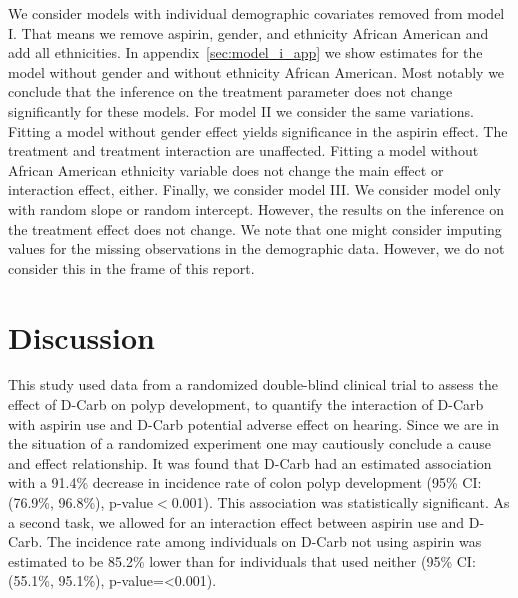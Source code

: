 \documentclass[paper=a4, fontsize=11pt]{scrartcl} %
\numberwithin{equation}{section} %
\numberwithin{figure}{section} %
\numberwithin{table}{section} %
\begin{document}
We consider models with individual demographic covariates removed from model I. That means we remove aspirin, gender, and ethnicity African American and add all ethnicities. In appendix~\ref{sec:model_i_app} we show estimates for the model without gender and without ethnicity African American. Most notably we conclude that the inference on the treatment parameter does not change significantly for these models. For model II we consider the same variations. Fitting a model without gender effect yields significance in the aspirin effect. The treatment and treatment interaction are unaffected. Fitting a model without African American ethnicity variable does not change the main effect or interaction effect, either. Finally, we consider model III. We consider model only with random slope or random intercept. However, the results on the inference on the treatment effect does not change. We note that one might consider imputing values for the missing observations in the demographic data. However, we do not consider this in the frame of this report.






\section{Discussion}
This study used data from a randomized double-blind clinical trial to assess the effect of D-Carb on polyp development, to quantify the interaction of D-Carb with aspirin use and D-Carb potential adverse effect on hearing. Since we are in the situation of a randomized experiment one may cautiously conclude a cause and effect relationship. It was found that D-Carb had an estimated association with a 91.4\% decrease in incidence rate of colon polyp development (95\% CI: (76.9\%, 96.8\%), p-value$<$0.001). This association was statistically significant. As a second task, we allowed for an interaction effect between aspirin use and D-Carb. The incidence rate among individuals on D-Carb not using aspirin was estimated to be 85.2\% lower than for individuals that used neither (95\% CI: (55.1\%, 95.1\%), p-value=<0.001).
\end{document}
